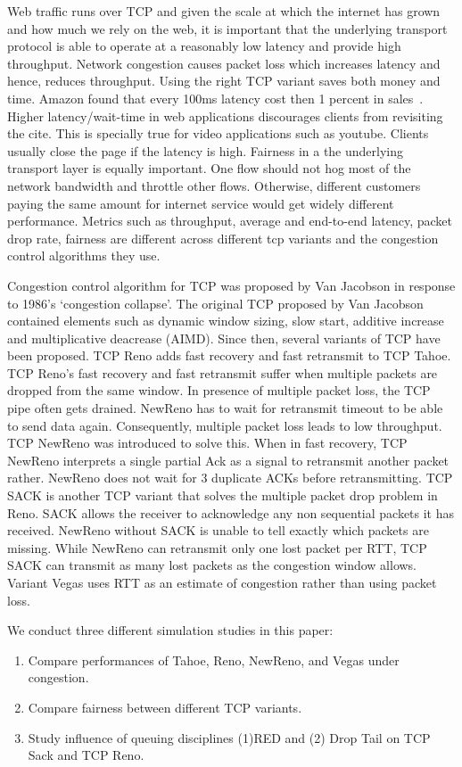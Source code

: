  Web traffic runs over TCP and given the scale at which the internet has grown and how much we rely on the web, it is important that the underlying transport protocol is able to operate at a reasonably low latency and provide high throughput. Network congestion causes packet loss which increases latency and hence, reduces throughput. Using the right TCP variant saves both money and time. Amazon found that every 100ms latency cost then 1 percent in sales~\cite{kohavi_online_2007}. Higher latency/wait-time in web applications discourages clients from revisiting the cite. This is specially true for video applications such as youtube. Clients usually close the page if the latency is high. Fairness in a the underlying transport layer is equally important. One flow should not hog most of the network bandwidth and throttle other flows. Otherwise, different customers paying the same amount for internet service would get widely different performance. Metrics such as throughput, average and end-to-end latency, packet drop rate, fairness are different across different tcp variants and the congestion control algorithms they use. 

Congestion control algorithm for TCP was proposed by Van Jacobson  in response to 1986's `congestion collapse'. The original TCP proposed by Van Jacobson contained elements such as dynamic window sizing, slow start, additive increase and multiplicative deacrease (AIMD). Since then, several variants of TCP have been proposed. TCP Reno adds fast recovery and fast retransmit to TCP Tahoe. TCP Reno's fast recovery and fast retransmit suffer when multiple packets are dropped from the same window. In presence of multiple packet loss, the TCP pipe often gets drained. NewReno has to wait for retransmit timeout to be able to send data again. Consequently, multiple packet loss leads to low throughput. TCP NewReno was introduced to solve this. When in fast recovery, TCP NewReno interprets a single partial Ack as a signal to retransmit another packet rather. NewReno does not wait for 3 duplicate ACKs before retransmitting. TCP SACK is another TCP variant that solves the multiple packet drop problem in Reno. SACK allows the receiver to acknowledge any non sequential packets it has received. NewReno  without SACK is unable to tell exactly which packets are missing. While NewReno can retransmit only one lost packet per RTT, TCP SACK can transmit as many lost packets as the congestion window allows. Variant Vegas uses RTT as an estimate of congestion rather than using packet loss.  

 We conduct three different simulation studies in this paper:\\
 \begin{enumerate}
 \item Compare performances of Tahoe, Reno, NewReno, and Vegas under congestion. 
 \item Compare fairness between different TCP variants.
 \item Study influence of queuing disciplines (1)RED and (2) Drop Tail on TCP Sack and TCP Reno.
 \end{enumerate}
